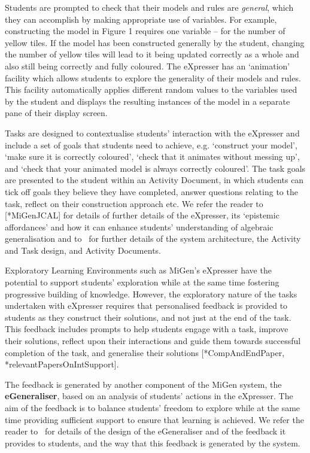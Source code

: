 Students are prompted to check that their models and rules are {\em
  general}, which they can accomplish by making appropriate use of
variables. For example, constructing the model in Figure 1 requires
one variable – for the number of yellow tiles. If the model has been
constructed generally by the student, changing the number of yellow
tiles will lead to it being updated correctly as a whole and also
still being correctly and fully coloured. The eXpresser has an
`animation' facility which allows students to explore the generality
of their models and rules. This facility automatically applies
different random values to the variables used by the student and
displays the resulting instances of the model in a separate pane of
their display screen.  

Tasks are designed to contextualise students' interaction with the
eXpresser and include a set of goals that students need to achieve,
e.g. `construct your model', `make sure it is correctly coloured',
`check that it animates without messing up', and `check that your
animated model is always correctly coloured'. The task goals are
presented to the student within an Activity Document, in which
students can tick off goals they believe they have completed, answer
questions relating to the task, reflect on their construction approach
etc. We refer the reader to [*MiGenJCAL] for details of 
further details of the eXpresser, its `epistemic
affordances' and how it can enhance
 students’ understanding of algebraic generalisation and to~\cite{CompAndEdPaper} for further details
of the system architecture, the Activity and Task design, and Activity Documents.  

Exploratory Learning Environments such as MiGen’s eXpresser
have the potential to support students' exploration while at the same
time fostering progressive building of knowledge. However, the
exploratory nature of the tasks undertaken with eXpresser requires
that personalised feedback is provided to students as they construct
their solutions, and not just at the end of the task. This feedback
includes prompts to help students engage with a task, improve their
solutions, reflect upon their interactions and guide them towards
successful completion of the task, and generalise their solutions
[*CompAndEndPaper, *relevantPapersOnIntSupport]. 

The feedback is generated by another
component of the MiGen system, the {\bf eGeneraliser}, based on an
analysis of students’ actions in the eXpresser. %
%
The aim of the
feedback is to balance students' freedom to explore while at the same
time providing sufficient support to ensure that learning is
achieved. We refer the reader to~\cite{relevantPapersOnIntSupport} for
details of the design of the eGeneraliser and of the feedback it
provides to students, and the way that this feedback is generated by
the system.  

